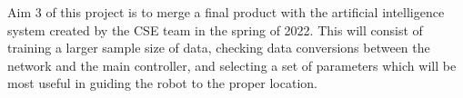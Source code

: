 	Aim 3 of this project is to merge a final product with the artificial intelligence system created by the CSE team in the spring of 2022. This will consist of training a larger sample size of data, checking data conversions between the network and the main controller, and selecting a set of parameters which will be most useful in guiding the robot to the proper location.
